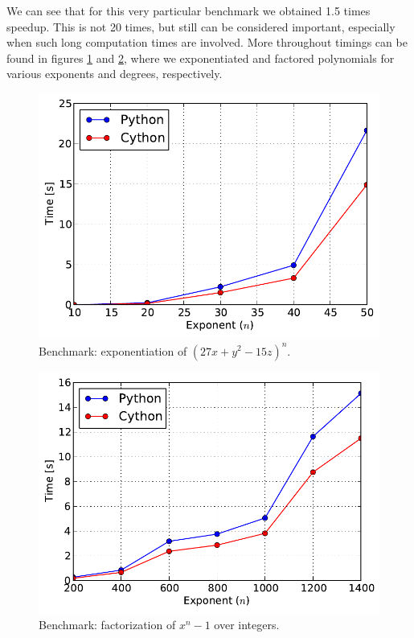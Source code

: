 We can see that for this very particular benchmark we obtained 1.5 times speedup. This is
not 20 times, but still can be considered important, especially when such long computation
times are involved. More throughout timings can be found in figures \ref{fig-cython-power}
and \ref{fig-cython-factor}, where we exponentiated and factored polynomials for various
exponents and degrees, respectively.
\begin{figure}[htbp]
\centering

\includegraphics{cython-power.pdf}
\caption{Benchmark: exponentiation of $(27 x + y^2 - 15 z)^n$.\label{fig-cython-power}}\end{figure}
\begin{figure}[htbp]
\centering

\includegraphics{cython-factor.pdf}
\caption{Benchmark: factorization of $x^n - 1$ over integers.\label{fig-cython-factor}}\end{figure}

